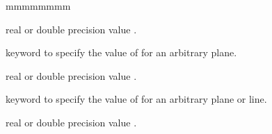 \begin{ListeDeDescription}{mmmmmmmm}
\item[\dusa{b} ] real or double precision value .

\item[\moc{C}] keyword to specify the value of  for an arbitrary plane.

\item[\dusa{b} ] real or double precision value .

\item[\moc{D}] keyword to specify the value of  for an arbitrary plane or line.

\item[\dusa{d} ] real or double precision value .
\end{ListeDeDescription}

\eject
